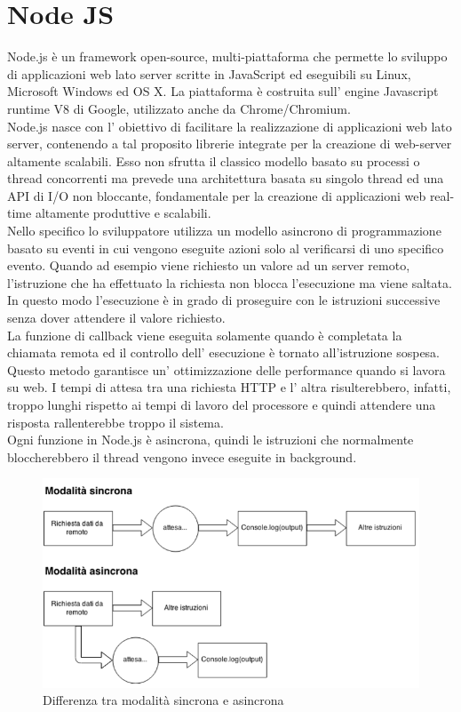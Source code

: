 \section{Node JS}
\label{sec:chapter_tecnologie_abilitanti_nodejs}

Node.js è un framework open-source, multi-piattaforma che permette lo sviluppo di applicazioni web lato server scritte in JavaScript ed eseguibili su Linux, Microsoft Windows ed OS X.
La piattaforma è costruita sull’ engine Javascript runtime V8 di Google, utilizzato anche da Chrome/Chromium.
\\
Node.js nasce con l’ obiettivo di facilitare la realizzazione di applicazioni web lato server, contenendo a tal proposito librerie integrate per la creazione di web-server altamente scalabili.
Esso non sfrutta il classico modello basato su processi o thread concorrenti ma prevede una architettura basata su singolo thread ed una API di I/O non bloccante, fondamentale per la creazione di applicazioni web real-time altamente produttive e scalabili.
\\
Nello specifico lo sviluppatore utilizza un modello asincrono di programmazione basato su eventi in cui vengono eseguite azioni solo al verificarsi di uno specifico evento. 
Quando ad esempio viene richiesto un valore ad un server remoto, l’istruzione che ha effettuato la richiesta non blocca l’esecuzione ma viene saltata.
\\
In questo modo l’esecuzione è in grado di proseguire con le istruzioni successive senza dover attendere il valore richiesto.
\\
La funzione di callback viene eseguita solamente quando è completata la chiamata remota ed il controllo dell’ esecuzione è tornato all’istruzione sospesa.
Questo metodo garantisce un’ ottimizzazione delle performance quando si lavora su web. 
I tempi di attesa tra una richiesta HTTP e l’ altra risulterebbero, infatti, troppo lunghi rispetto ai tempi di lavoro del processore e quindi attendere una risposta rallenterebbe troppo il sistema.
\\
Ogni funzione in Node.js è asincrona, quindi le istruzioni che normalmente bloccherebbero il thread vengono invece eseguite in background.
\\
\begin{figure}[htb]
 \centering
 \includegraphics[width=0.9\linewidth]{images/chapter_tecnologie_abilitanti/tecnologie_abilitanti_node_mod.png}\hfill
 \caption[NodeJS: modalità sincrona e asincrona]{Differenza tra modalità sincrona e asincrona}
 \label{fig:tecnologie_abilitanti_node_mod}
\end{figure}
